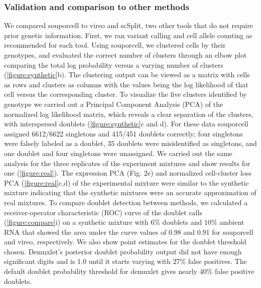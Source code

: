 \subsubsection{Validation and comparison to other methods}

\par{
We compared souporcell to vireo and scSplit, two other tools that do not require prior genetic information. First, we ran variant calling and cell allele counting as recommended for each tool. Using souporcell, we clustered cells by their genotypes, and evaluated the correct number of clusters through an elbow plot comparing the total log probability versus a varying number of clusters (\ref{figure:synthetic}b). The clustering output can be viewed as a matrix with cells as rows and clusters as columns with the values being the log likelihood of that cell versus the corresponding cluster. To visualize the five clusters identified by genotype we carried out a Principal Component Analysis (PCA) of the normalized log likelihood matrix, which reveals a clear separation of the clusters, with interspersed doublets (\ref{figure:synthetic}c and d).  For these data souporcell assigned 6612/6622 singletons and 415/451 doublets correctly; four singletons were falsely labeled as a doublet, 35 doublets were misidentified as singletons, and one doublet and four singletons were unassigned. We carried out the same analysis for the three replicates of the  experiment mixtures and show results for one (\ref{figure:real}). The expression PCA (Fig. 2e) and normalized cell-cluster loss PCA (\ref{figure:real}c,d) of the experimental mixture were similar to the synthetic mixture indicating that the synthetic mixtures were an accurate approximation of real mixtures. To compare doublet detection between methods, we calculated a receiver-operator characteristic (ROC) curve of the doublet calls (\ref{figure:compare}i) on a synthetic mixture with 6\% doublets and 10\% ambient RNA that showed the area under the curve values of 0.98 and 0.91 for souporcell and vireo, respectively. We also show point estimates for the doublet threshold chosen. Demuxlet's posterior doublet probability output did not have enough significant digits and is 1.0 until it starts varying with 27\% false positives. The default doublet probability threshold for demuxlet gives nearly 40\% false positive doublets.
} \\

